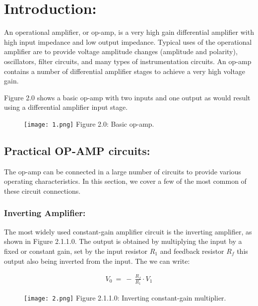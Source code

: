 \section{Introduction:}

An operational amplifier, or op-amp, is a very high gain differential amplifier with high input impedance and low output impedance. Typical uses of the operational amplifier are to provide voltage amplitude changes (amplitude and polarity), oscillators, filter circuits, and many types of instrumentation circuits. An op-amp contains a number of differential amplifier stages to achieve a very high voltage gain. \hfill \break

Figure 2.0 shows a basic op-amp with two inputs and one output as would result using a differential amplifier input stage. 

\begin{figure}[H]
\texttt{[image: 1.png]}
\centering \linebreak \linebreak Figure 2.0: Basic op-amp.
\end{figure}

\subsection{Practical OP-AMP circuits:}

The op-amp can be connected in a large number of circuits to provide various operating characteristics. In this section, we cover a few of the most common of these circuit connections.

\subsubsection{Inverting Amplifier:}

The most widely used constant-gain amplifier circuit is the inverting amplifier, as shown in Figure 2.1.1.0. The output is obtained by multiplying the input by a fixed or constant gain, set by the input resistor $R_{1}$ and feedback resistor $R_{f}$ this output also being inverted from the input. The we can write: \hfill \break

\begin{ceqn}
\begin{align*}
V_{0}\ =\ -\ \frac{R_{f}}{R_{1}} \cdot V_{1}
\end{align*}
\end{ceqn} \hfill 

\begin{figure}[H]
\texttt{[image: 2.png]}
\centering \linebreak \linebreak Figure 2.1.1.0: Inverting constant-gain multiplier.
\end{figure}

